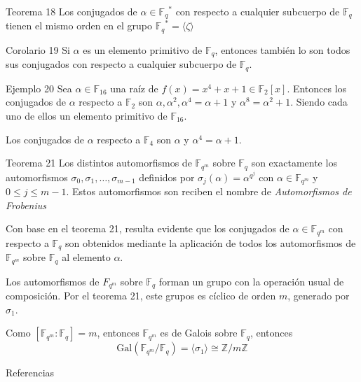 \documentclass[presentation]{beamer}
\newcommand{\F}{\mathds{F}}
\newcommand{\Z}{\mathds{Z}}
\begin{document}
\begin{frame}
  \begin{block}{Teorema 18}
    Los conjugados de $\alpha \in {\F_q}^*$ con respecto a cualquier subcuerpo de $\F_q$ tienen el mismo orden en el grupo ${\F_q}^* = \langle \zeta \rangle$
  \end{block}
  \pause
  \begin{block}{Corolario 19}
    Si $\alpha$ es un elemento primitivo de $\F_q$, entonces también lo son todos sus conjugados con respecto a cualquier subcuerpo de $\F_q$.
  \end{block}
\end{frame}

\begin{frame}
  \begin{block}{Ejemplo 20}
    Sea $\alpha \in \F_{16}$ una raíz de $f(x) = x^4 + x + 1 \in \F_2[x]$. Entonces los conjugados de $\alpha$ respecto a $\F_2$ son $\alpha, \alpha^2, \alpha^4 = \alpha+1$ y $\alpha^8 = \alpha^2 + 1$. Siendo cada uno de ellos un elemento primitivo de $\F_{16}$.

    \vspace*{1em}
    Los conjugados de $\alpha$ respecto a $\F_4$ son $\alpha$ y  $\alpha^4 = \alpha+1$.
  \end{block}
\end{frame}

\begin{frame}
  \begin{block}{Teorema 21}
    Los distintos automorfismos de $\F_{q^m}$ sobre $\F_q$ son exactamente los automorfismos $\sigma_0, \sigma_1, \ldots, \sigma_{m-1}$ definidos por $\sigma_j (\alpha) = \alpha^{q^j}$ con $\alpha \in \F_{q^m}$ y $0 \leq j \leq m-1 $. Estos automorfismos son reciben el nombre de \emph{Automorfismos de Frobenius}
  \end{block}
\end{frame}

\begin{frame}
  \begin{block}{}
    Con base en el teorema 21, resulta evidente que los conjugados de $\alpha \in \F_{q^m}$ con respecto a $\F_q$ son obtenidos mediante la aplicación de todos los automorfismos de $\F_{q^m}$ sobre $\F_q$ al elemento $\alpha$.
  \end{block}

  \begin{block}{}
    Los automorfismos de $F_{q^m}$ sobre $\F_q$ forman un grupo con la operación usual de composición. Por el teorema 21, este grupos es cíclico de orden $m$, generado por $\sigma_1$.
  \end{block}

  \begin{block}{}
    Como $[\F_{q^m}:\F_q] = m$, entonces $\F_{q^m}$ es de Galois sobre $\F_q$, entonces
    \begin{equation*}
      \mbox{Gal}(\F_{q^m} / \F_q) = \langle \sigma_1 \rangle \cong \Z / m\Z
    \end{equation*}
  \end{block}
\end{frame}

\begin{frame}
  \begin{block}{Referencias}
    \nocite{*}
    
    
  \end{block}
\end{frame}
\end{document}
